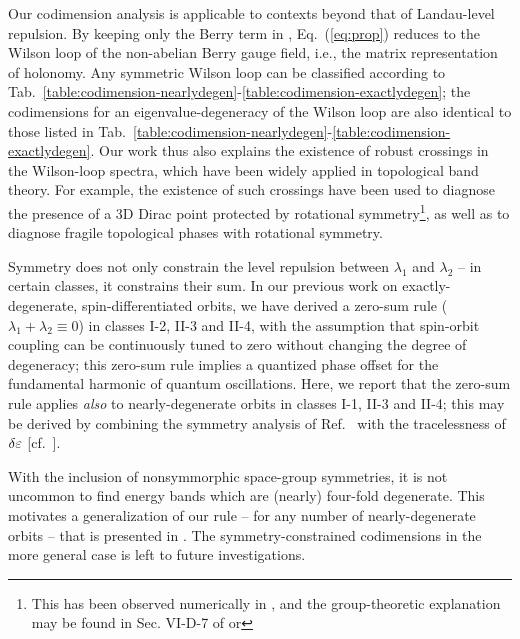 \documentclass[aps, showpacs, twocolumn, notitlepage, superscriptaddress]{revtex4-1}
\begin{document}
Our codimension analysis is applicable to contexts beyond that of Landau-level repulsion. By keeping only the Berry term in , Eq.\ ({\ref{eq:prop}}) reduces to the Wilson loop of the non-abelian Berry gauge field\cite{wilczek_appearance_1984}, i.e., the matrix representation of holonomy.  Any symmetric Wilson loop can be classified according to Tab.\ \ref{table:codimension-nearlydegen}-\ref{table:codimension-exactlydegen}; the codimensions for an eigenvalue-degeneracy of the Wilson loop are also identical to those listed in Tab.\ \ref{table:codimension-nearlydegen}-\ref{table:codimension-exactlydegen}. Our work thus also explains the existence of robust crossings in the Wilson-loop spectra, which have been widely applied in topological band theory. For example, the existence of such crossings have been used to diagnose the presence of a 3D Dirac point protected by rotational symmetry\footnote{This has been observed numerically in , and the group-theoretic explanation may be found in Sec. VI-D-7 of  or }, as well as to diagnose fragile topological phases with rotational symmetry\cite{bouhon_wilson_2018,bradlyn_disconnected_2018}.


Symmetry does not only constrain the level repulsion between $\lambda_1$ and $\lambda_2$ -- in certain classes, it constrains their sum. In our previous work on exactly-degenerate, spin-differentiated orbits\cite{100p,topoferm}, we have derived a zero-sum rule ($\lambda_1{+}\lambda_2{\equiv}0$) in classes I-2, II-3 and II-4, with the assumption that spin-orbit coupling can be continuously tuned to zero without changing the degree of degeneracy; this zero-sum rule implies a quantized phase offset for the fundamental harmonic of quantum oscillations\cite{topoferm}. Here, we report that the zero-sum rule applies \textit{also} to nearly-degenerate orbits in classes I-1, II-3 and II-4; this may be derived by combining the symmetry analysis of Ref.\  with the tracelessness of $\delta\varepsilon$ [cf.\ ]. 


With the inclusion of nonsymmorphic space-group symmetries, it is not uncommon to find energy bands which are (nearly) four-fold degenerate\cite{michel_elementary_2001,wang_hourglass_2016,bradlyn_topological_2017}. This motivates a generalization of our rule -- for any number of nearly-degenerate orbits -- that is presented in . The symmetry-constrained codimensions in the more general case is left to future investigations. 
\end{document}
